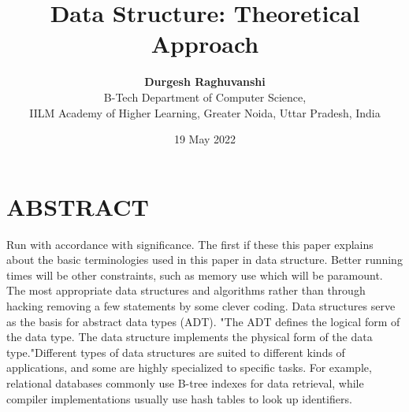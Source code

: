 \documentclass{article}
\title{\textbf{Data Structure: Theoretical Approach}}
\author{\textbf{Durgesh Raghuvanshi}\\B-Tech Department of Computer Science,\\
IILM Academy of Higher Learning, Greater Noida, Uttar Pradesh, India}
\date{19 May 2022}
\begin{document}
\maketitle

\section*{ABSTRACT}
Run with accordance with significance. The first if
these this paper explains about the basic terminologies
used in this paper in data structure. Better running
times will be other constraints, such as memory use
which will be paramount. The most appropriate data
structures and algorithms rather than through hacking
removing a few statements by some clever coding.
Data structures serve as the basis for abstract data
types (ADT). "The ADT defines the logical form of
the data type. The data structure implements the
physical form of the data type."Different types of data
structures are suited to different kinds of applications,
and some are highly specialized to specific tasks. For
example, relational databases commonly use B-tree
indexes for data retrieval, while compiler
implementations usually use hash tables to look up
identifiers.
\end{document}
